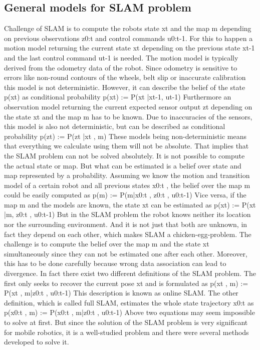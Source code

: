 \subsection{General models for SLAM problem}
Challenge of SLAM is to compute the robots state xt and the map m depending on previous observations z0:t and control commands u0:t-1. For this to happen a motion model returning the current state xt depending on the previous state xt-1 and the last control command ut-1 is needed. The motion model is typically derived from the odometry data of the robot. Since odometry is sensitive to errors like non-round contours of the wheels, belt slip or inaccurate calibration this model is not deterministic. However, it can describe the belief of the state p(xt) as conditional probability 
p(xt) := P(xt |xt-1, ut-1)
Furthermore an observation model returning the current expected sensor output zt depending on the state xt and the map m has to be known. Due to inaccuracies of the sensors, this model is also not deterministic, but can be described as conditional probability 
p(zt) := P(zt |xt , m)
These models being non-deterministic means that everything we calculate using them will not be absolute. That implies that the SLAM problem can not be solved absolutely. It is not possible to compute the actual state or map. But what can be estimated is a belief over state and map represented by a probability. Assuming we know the motion and transition model of a certain robot and all previous states x0:t , the belief over the map m could be easily computed as 
p(m) := P(m|x0:t , z0:t , u0:t-1) 
Vice versa, if the map m and the models are known, the state xt can be estimated as 
p(xt) := P(xt |m, z0:t , u0:t-1)
But in the SLAM problem the robot knows neither its location nor the surrounding environment. And it is not just that both are unknown, in fact they depend on each other, which makes SLAM a chicken-egg-problem. The challenge is to compute the belief over the map m and the state xt simultaneously since they can not be estimated one after each other. Moreover, this has to be done carefully because wrong data association can lead to divergence. In fact there exist two different definitions of the SLAM problem. The first only seeks to recover the current pose xt and is formulated as 
p(xt , m) := P(xt , m|z0:t , u0:t-1)
This description is known as online SLAM. The other definition, which is called full SLAM, estimates the whole state trajectory x0:t as 
p(x0:t , m) := P(x0:t , m|z0:t , u0:t-1) 
Above two equations may seem impossible to solve at first. But since the solution of the SLAM problem is very significant for mobile robotics, it is a well-studied problem and there were several methods developed to solve it.\cite{ustintern}


